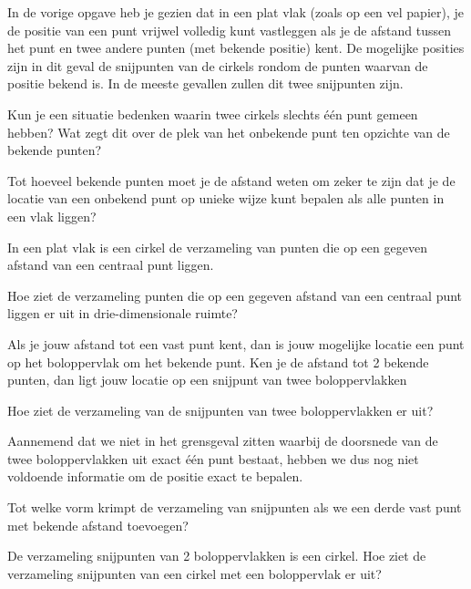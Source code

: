 In de vorige opgave heb je gezien dat in een plat vlak (zoals op een vel papier), je de positie van een punt vrijwel volledig kunt vastleggen als je de afstand tussen het punt en twee andere punten (met bekende positie) kent. De mogelijke posities zijn in dit geval de snijpunten van de cirkels rondom de punten waarvan de positie bekend is. In de meeste gevallen zullen dit twee snijpunten zijn.

\begin{opgave}
	Kun je een situatie bedenken waarin twee cirkels slechts \'e\'en punt gemeen hebben? Wat zegt dit over de plek van het onbekende punt ten opzichte van de bekende punten?
\end{opgave}

\begin{opgave}
	Tot hoeveel bekende punten moet je de afstand weten om zeker te zijn dat je de locatie van een onbekend punt op unieke wijze kunt bepalen als alle punten in een vlak liggen?
\end{opgave}

In een plat vlak is een cirkel de verzameling van punten die op een gegeven afstand van een centraal punt liggen.

\begin{opgave}
	Hoe ziet de verzameling punten die op een gegeven afstand van een centraal punt liggen er uit in drie-dimensionale ruimte?
\end{opgave}

Als je jouw afstand tot een vast punt kent, dan is jouw mogelijke locatie een punt op het boloppervlak om het bekende punt. Ken je de afstand tot 2 bekende punten, dan ligt jouw locatie op een snijpunt van twee boloppervlakken

\begin{opgave}
	Hoe ziet de verzameling van de snijpunten van twee boloppervlakken er uit?
\end{opgave}

Aannemend dat we niet in het grensgeval zitten waarbij de doorsnede van de twee boloppervlakken uit exact \'e\'en punt bestaat, hebben we dus nog niet voldoende informatie om de positie exact te bepalen.

\begin{opgave}[\vinger]
	Tot welke vorm krimpt de verzameling van snijpunten als we een derde vast punt met bekende afstand toevoegen?
	\begin{hint}
		De verzameling snijpunten van 2 boloppervlakken is een cirkel. Hoe ziet de verzameling snijpunten van een cirkel met een boloppervlak er uit?
	\end{hint}
\end{opgave}

